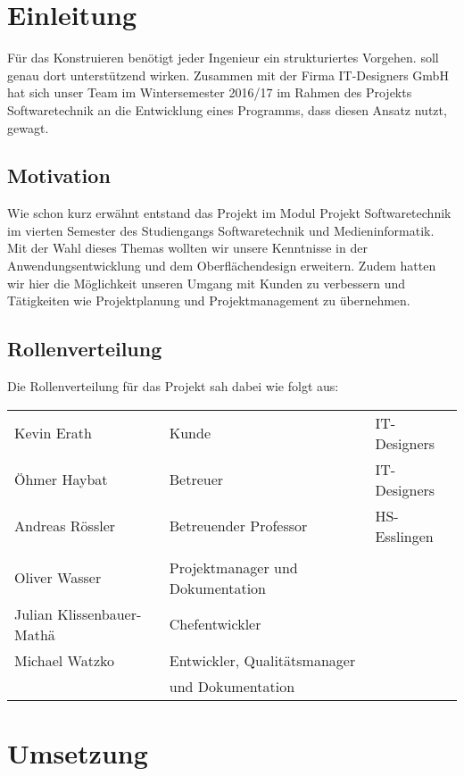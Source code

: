 
\section{Einleitung}

Für das Konstruieren benötigt jeder Ingenieur ein strukturiertes Vorgehen. \textFlowDesign{}
soll genau dort unterstützend wirken.
Zusammen mit der Firma IT-Designers GmbH hat sich unser Team im Wintersemester 2016/17 im
Rahmen des Projekts Softwaretechnik an die Entwicklung eines Programms, dass diesen Ansatz
nutzt, gewagt.

\subsection{Motivation}
Wie schon kurz erwähnt entstand das Projekt \textFlowDesign{} im Modul Projekt Softwaretechnik
im vierten Semester des Studiengangs Softwaretechnik und Medieninformatik.
Mit der Wahl dieses Themas wollten wir unsere Kenntnisse in der Anwendungsentwicklung und dem
Oberflächendesign erweitern. Zudem hatten wir hier die Möglichkeit unseren Umgang mit Kunden
zu verbessern und Tätigkeiten wie Projektplanung und Projektmanagement zu übernehmen.

\subsection{Rollenverteilung}
Die Rollenverteilung für das Projekt sah dabei wie folgt aus:

\begin{center}
	\begin{tabular}{l|l l}
		Kevin Erath & Kunde     & IT-Designers \\
		Öhmer Haybat & Betreuer & IT-Designers \\
		Andreas Rössler & Betreuender Professor & HS-Esslingen \\
		\\
		Oliver Wasser             & Projektmanager und Dokumentation & \\
		Julian Klissenbauer-Mathä & Chefentwickler & \\
		Michael Watzko            & Entwickler, Qualitätsmanager  \\
		                          & und Dokumentation \\
	\end{tabular}
\end{center}

\pagebreak
\section{Umsetzung}

